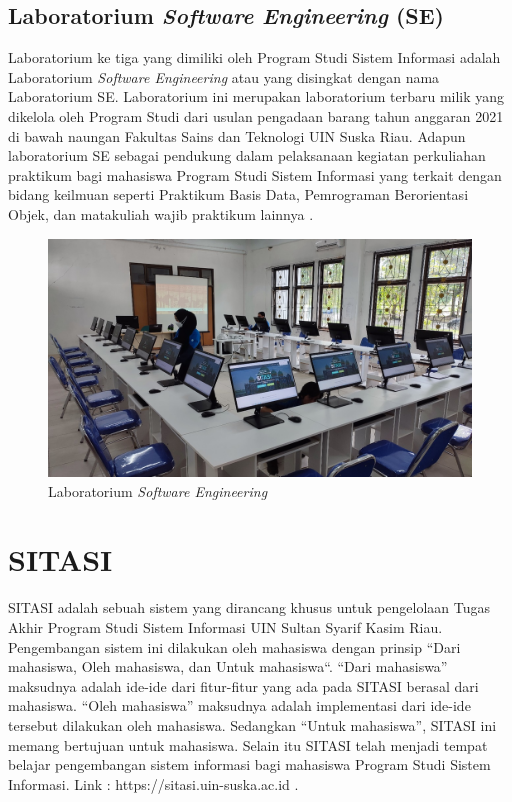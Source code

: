 \subsection{Laboratorium \textit{Software Engineering} (SE)}
Laboratorium ke tiga yang dimiliki oleh Program Studi Sistem Informasi adalah Laboratorium \textit{Software Engineering} atau yang disingkat dengan nama Laboratorium SE. Laboratorium ini merupakan laboratorium terbaru milik yang dikelola oleh Program Studi dari usulan pengadaan barang tahun anggaran 2021 di bawah naungan Fakultas Sains dan Teknologi UIN Suska Riau. Adapun laboratorium SE sebagai pendukung dalam pelaksanaan kegiatan perkuliahan praktikum bagi mahasiswa Program Studi Sistem Informasi yang terkait dengan bidang keilmuan seperti Praktikum Basis Data, Pemrograman Berorientasi Objek, dan matakuliah wajib praktikum lainnya \cite{lab-si-website}.

\begin{figure}
	\centering
	\includegraphics[width=0.82\linewidth]{konten/gambar/lab-se.jpg}
	\caption{Laboratorium \textit{Software Engineering} \protect\cite{labsi2023}}
	\label{fig:lab-se}
\end{figure}

\section{SITASI}
SITASI adalah sebuah sistem yang dirancang khusus untuk pengelolaan Tugas Akhir Program Studi Sistem Informasi UIN Sultan Syarif Kasim Riau. Pengembangan sistem ini dilakukan oleh mahasiswa dengan prinsip “Dari mahasiswa, Oleh mahasiswa, dan Untuk mahasiswa“. “Dari mahasiswa” maksudnya adalah ide-ide dari fitur-fitur yang ada pada SITASI berasal dari mahasiswa. “Oleh mahasiswa” maksudnya adalah implementasi dari ide-ide tersebut dilakukan oleh mahasiswa. Sedangkan “Untuk mahasiswa”, SITASI ini memang bertujuan untuk mahasiswa. Selain itu SITASI telah menjadi tempat belajar pengembangan sistem informasi bagi mahasiswa Program Studi Sistem Informasi. Link : https://sitasi.uin-suska.ac.id \cite{web-prodi}.

